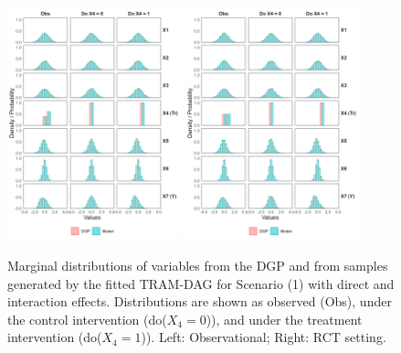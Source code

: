 \begin{figure}[htbp]
\centering
\includegraphics[width=0.45\textwidth]{img/results/observ_scenario1_sampling_distributions_vertical.png}
\includegraphics[width=0.45\textwidth]{img/results/rct_scenario1_sampling_distributions_vertical.png}
\caption{Marginal distributions of variables from the DGP and from samples generated by the fitted TRAM-DAG for Scenario (1) with direct and interaction effects. Distributions are shown as observed (Obs), under the control intervention (do($X_4 = 0$)), and under the treatment intervention (do($X_4 = 1$)). Left: Observational; Right: RCT setting.}
\label{fig:scenario1_sampling_distributions_vertical}
\end{figure}


